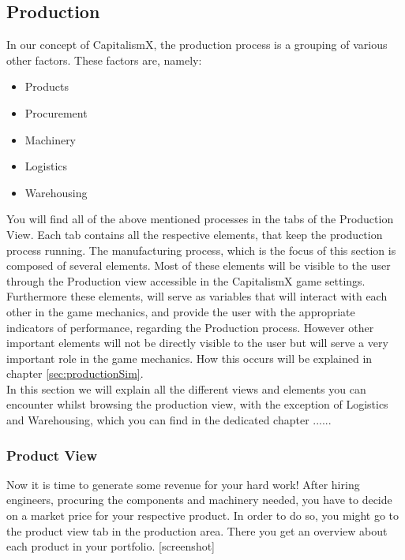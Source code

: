 \subsection{Production}
\label{production_manual}

In our concept of CapitalismX, the production process is a grouping of various other factors. These factors are, namely: 
\begin{itemize} 
\item Products 
\item Procurement  
\item Machinery 
\item Logistics 
\item Warehousing 
\end{itemize}
You will find all of the above mentioned processes in the tabs of the Production View. Each tab contains all the respective elements, that keep the production process running.
The manufacturing process, which is the focus of this section is composed of several elements. Most of these elements will be visible to the user through the Production view accessible in the CapitalismX game settings. Furthermore these elements, will serve as variables that will interact with each other in the game mechanics, and provide the user with the appropriate indicators of performance, regarding the Production process. However other important elements will not be directly visible to the user but will serve a very important role in the game mechanics. How this occurs will be explained in chapter \ref{sec:productionSim}. \\
In this section we will explain all the different views and elements you can encounter whilst browsing the production view, with the exception of Logistics and Warehousing, which you can find in the dedicated chapter ...... \\
\subsubsection{Product View}
\label{sub:ProductView}
Now it is time to generate some revenue for your hard work! After hiring engineers, procuring the components and machinery needed, you have to decide on a market price for your respective product. In order to do so, you might go to the product view tab in the production area. There you get an overview about each product in your portfolio. [screenshot]

